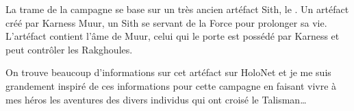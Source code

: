 \documentclass{jdrp}
\begin{document}
	La trame de la campagne se base sur un très ancien artéfact Sith, le . Un artéfact créé par Karness Muur, un Sith se servant de la Force pour prolonger sa vie. L’artéfact contient l’âme de Muur, celui qui le porte est possédé par Karness et peut contrôler les Rakghoules.

	On trouve beaucoup d’informations sur cet artéfact sur HoloNet et je me suis grandement inspiré de ces informations pour cette campagne en faisant vivre à mes héros les aventures des divers individus qui ont croisé le Talisman\ldots

	\twocolumn

	
	
	
	

	\onecolumn
	\nocite{*}
	\printbibliography
\end{document}
